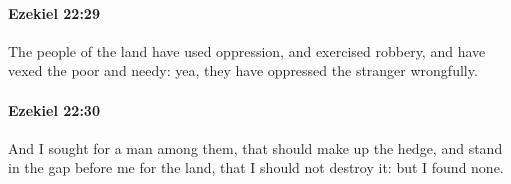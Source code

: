 		\paragraph{Ezekiel 22:29} %
			\label{EZEKIEL-22-29}

			The people of the land have used oppression, and exercised robbery, and have vexed the poor and needy: yea, they have oppressed the stranger wrongfully.


		\paragraph{Ezekiel 22:30} %
			\label{EZEKIEL-22-30}

			And I sought for a man among them, that should make up the hedge, and stand in the gap before me for the land, that I should not destroy it: but I found none.


